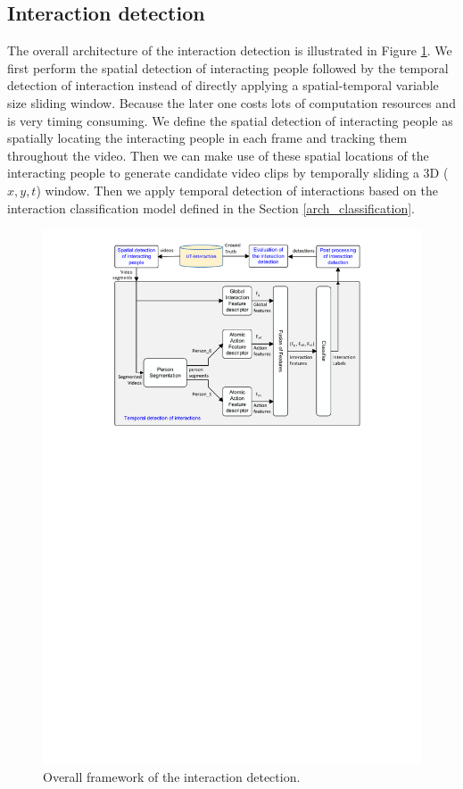 \subsection{Interaction detection}
The overall architecture of the interaction detection is illustrated in Figure \ref{fig:arch_det}. We first perform the spatial detection of interacting people followed by the temporal detection of interaction instead of directly applying a spatial-temporal variable size sliding window. Because the later one costs lots of computation resources and is very timing consuming. We define the spatial detection of interacting people as spatially locating the interacting people in each frame and tracking them throughout the video. Then we can make use of these spatial locations of the interacting people to generate candidate video clips by temporally sliding a 3D (\(x,y,t\)) window. Then we apply temporal detection of interactions based on the interaction classification model defined in the Section \ref{arch_classification}.       
 \begin{figure}
	\includegraphics[trim=2.5cm 18.5cm 0cm 0.5cm]{fig01/arch_det.pdf}
	\caption{Overall framework of the interaction detection. }
	\label{fig:arch_det}
\end{figure}

